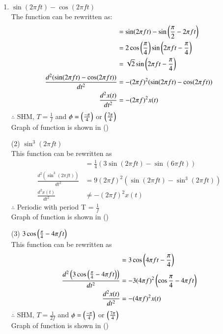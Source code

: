 \documentclass[journal,12pt,onecolumn]{IEEEtran}
\theoremstyle{remark}
\begin{document}
   \begin{enumerate}
   \begin{table}[!ht]
    \centering
        
    \caption{input parameters}
    \label{tab:}
\end{table}
\item $\sin(2\pi f t)- \cos(2\pi f t)$\\
The function can be rewritten as:
 \begin{align}
  &= \sin(2\pi f t) - \sin\left(\frac{\pi}{2} - 2\pi f t\right)\\
  &=2 \cos\left(\frac{\pi}{4}\right) \sin\left(2\pi f t - \frac{\pi}{4}\right)\\
  &=\sqrt{2}\sin\left(2\pi f t - \frac{\pi}{4}\right)\\
  \frac{d^2(\sin(2\pi f t)- \cos(2\pi f t))}{dt^2}&=-(2\pi f)^2(\sin(2\pi f t)- \cos(2\pi f t))\\
     \frac{d^2 x(t)}{dt^2} &= - (2\pi f)^2 x(t)
 \end{align}
 \(\therefore\) SHM, \(T = \frac{1}{f}\) and \(\phi = \left(\frac{-\pi}{4}\right)\) or \(\left(\frac{7\pi}{4}\right)\)\\
 Graph of function is shown in ()

    \item[(2)] $\sin^3(2\pi f t)$\\

 This function can be rewritten as\\ 
 \begin{align}
  &=\frac{1}{4}(3\sin(2\pi f t)-\sin(6\pi  f t))\\
  \frac{d^2(\sin^3(2\pi f t))}{dt^2}&=9(2\pi f)^2(\sin(2\pi ft)-\sin^3(2\pi ft))\\
   \frac{d^2 x(t)}{dt^2} &\neq - (2\pi f)^2 x(t)
 \end{align}
 $\therefore$ Periodic with period {T} = $\frac{1}{f}$ \\
Graph of function is shown in ()
\\
    \item[(3)] $3\cos\left(\frac{\pi}{4}-4\pi f t\right)$\\

This function can be rewritten as\\ 
 \begin{align}
  &=3\cos\left(4\pi f t-\frac{\pi}{4}\right)\\
  \frac{d^2\left(3\cos\left(\frac{\pi}{4}-4\pi f t\right)\right)}{dt^2}&=-3(4\pi f)^2\left(\cos\frac{\pi}{4}-4\pi f t\right)\\
  \frac{d^2 x(t)}{dt^2} &= - (4\pi f)^2 x(t)
 \end{align}
 $\therefore$  SHM, $T = \frac{1}{2f}$  and  $\phi=\left(\frac{-\pi}{4}\right)$ or $\left(\frac{7\pi}{4}\right)$ \\
 Graph of function is shown in ()
 \\


\end{enumerate}
\end{document}
